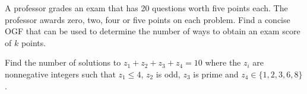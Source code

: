 \documentclass{article}
\begin{document}
\begin{problem}%
    A professor grades an exam that has 20 questions worth five points each. The professor awards zero, two, four or five points on each problem. Find a concise OGF that can be used to determine the number of ways to obtain an exam score of $k$ points.
\end{problem}

\setcounter{problem}{6}
\begin{problem}%
    Find the number of solutions to $z_1 + z_2 + z_3 + z_4 = 10$ where the $z_i$ are nonnegative integers such that $z_1 \le 4$, $z_2$ is odd, $z_3$ is prime and $z_4 \in \{1, 2, 3, 6, 8\}$.
\end{problem}
\end{document}
